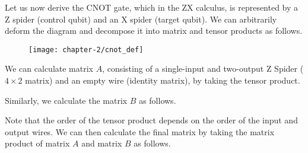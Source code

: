 Let us now derive the CNOT gate, which in the ZX calculus, is represented by a Z spider (control qubit) and an X spider (target qubit). We can arbitrarily deform the diagram and decompose it into matrix and tensor products as follows.
\begin{figure}[H]
    \centering
    \texttt{[image: chapter-2/cnot\_def]}
\end{figure}

We can calculate matrix $A$, consisting of a single-input and two-output Z Spider ($4 \times 2$ matrix) and an empty wire (identity matrix), by taking the tensor product.
\begin{figure}[H]
    \centering
\end{figure}

Similarly, we calculate the matrix $B$ as follows.
\begin{figure}[H]
    \centering
\end{figure}

Note that the order of the tensor product depends on the order of the input and output wires. We can then calculate the final matrix by taking the matrix product of matrix $A$ and matrix $B$ as follows.

